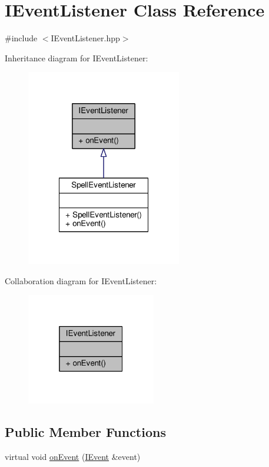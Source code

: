 \hypertarget{class_i_event_listener}{\section{I\-Event\-Listener Class Reference}
\label{class_i_event_listener}
}


{\ttfamily \#include $<$I\-Event\-Listener.\-hpp$>$}



Inheritance diagram for I\-Event\-Listener\-:
\nopagebreak
\begin{figure}[H]
\begin{center}
\leavevmode
\includegraphics[width=192pt]{class_i_event_listener__inherit__graph}
\end{center}
\end{figure}


Collaboration diagram for I\-Event\-Listener\-:
\nopagebreak
\begin{figure}[H]
\begin{center}
\leavevmode
\includegraphics[width=160pt]{class_i_event_listener__coll__graph}
\end{center}
\end{figure}
\subsection*{Public Member Functions}
\begin{DoxyCompactItemize}
\item 
virtual void \hyperlink{class_i_event_listener_a4b31aabdd3a75fb19017ea47ed729dc8}{on\-Event} (\hyperlink{class_i_event}{I\-Event} \&event)
\end{DoxyCompactItemize}


